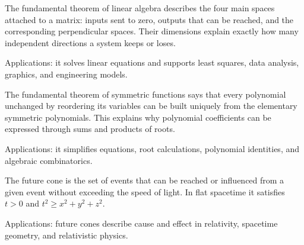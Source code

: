 The fundamental theorem of linear algebra describes the four main spaces attached to a matrix: inputs sent to zero, outputs that can be reached, and the corresponding perpendicular spaces. Their dimensions explain exactly how many independent directions a system keeps or loses. \par\noindent Applications: it solves linear equations and supports least squares, data analysis, graphics, and engineering models.

The fundamental theorem of symmetric functions says that every polynomial unchanged by reordering its variables can be built uniquely from the elementary symmetric polynomials. This explains why polynomial coefficients can be expressed through sums and products of roots. \par\noindent Applications: it simplifies equations, root calculations, polynomial identities, and algebraic combinatorics.

The future cone is the set of events that can be reached or influenced from a given event without exceeding the speed of light. In flat spacetime it satisfies $t>0$ and $t^2\ge x^2+y^2+z^2$. \par\noindent Applications: future cones describe cause and effect in relativity, spacetime geometry, and relativistic physics.
